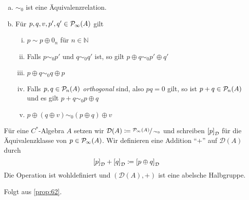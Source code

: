 \begin{proposition}[{name=[{grundlegende Eigenschaften der Relation $\sim_0$}]},label=prop:62]
	\leavevmode
	\begin{enumerate}[a)]
		\item $\sim_0$ ist eine Äquivalenzrelation.
		\item Für $p,q,v,p',q' \in \Pinfty(A)$ gilt
		\begin{enumerate}[(i)]
			\item $p \sim p \oplus 0_n$ für $n \in \mathbb{N}$
			\item Falls $p \sim_0 p'$ und $q \sim_0 q'$ ist, so gilt $p \oplus q \sim_0 p' \oplus q'$
			\item $p \oplus q \sim_0 q \oplus p$
			\item Falls $p,q \in \kernedP_n(A)$ \emph{orthogonal} sind, also $pq=0$ gilt, so ist $p +q \in \kernedP_n(A)$ und es gilt $p + q \sim_0 p \oplus q$
			\item $p \oplus (q \oplus v) \sim_0 (p \oplus q) \oplus v$
		\end{enumerate}
	\end{enumerate}
\end{proposition}
\begin{beweis}
\end{beweis}

\begin{definitionP}
	Für eine $C^*$-Algebra $A$ setzen wir $\mathcal{D}(A) \coloneqq \sfrac{\Pinfty(A)}{\sim_0}$ und schreiben $\benbrace*{p}_\mathcal{D}$ für die Äquivalenzklasse von $p \in \Pinfty(A)$.
	Wir definieren eine Addition \enquote{$+$} auf $\mathcal{D}(A)$ durch
	\[
		\benbrace*{p}_\mathcal{D} + \benbrace*{q}_\mathcal{D} \coloneqq \benbrace*{p \oplus q}_\mathcal{D}
	\]
	Die Operation ist wohldefiniert und $(\mathcal{D}(A),+)$ ist eine abelsche Halbgruppe.
\end{definitionP}
\begin{beweis}
	Folgt aus \autoref{prop:62}.
\end{beweis}

